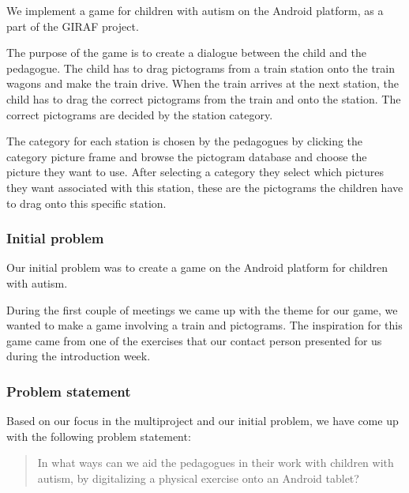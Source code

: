 We implement a game for children with autism on the Android platform, as a part of the GIRAF project.

The purpose of the game is to create a dialogue between the child and the pedagogue. The child has to drag pictograms from a train station onto the train wagons and make the train drive. When the train arrives at the next station, the child has to drag the correct pictograms from the train and onto the station. The correct pictograms are decided by the station category.

The category for each station is chosen by the pedagogues by clicking the category picture frame and browse the pictogram database and choose the picture they want to use. After selecting a category they select which pictures they want associated with this station, these are the pictograms the children have to drag onto this specific station.

\subsubsection*{Initial problem}

Our initial problem was to create a game on the Android platform for children with autism. 

During the first couple of meetings we came up with the theme for our game, we wanted to make a game involving a train and pictograms. The inspiration for this game came from one of the exercises that our contact person presented for us during the introduction week.

\subsubsection*{Problem statement}

Based on our focus in the multiproject and our initial problem, we have come up with the following problem statement:

\begin{quote}
In what ways can we aid the pedagogues in their work with children with autism, by digitalizing a physical exercise onto an Android tablet?
\end{quote}